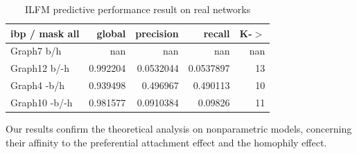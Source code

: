 \begin{table} \label{table:real2}
    \caption{ILFM predictive performance result on real networks}
\begin{tabular}{lrrrr}
\hline
 ibp / mask all   &     global &   precision &      recall &   K-\ensuremath{>} \\
\hline
 Graph7 b/h       & nan        & nan         & nan         &   nan \\
 Graph12 b/-h     &   0.992204 &   0.0532044 &   0.0537897 &    13 \\
 Graph4 -b/h      &   0.939498 &   0.496967  &   0.490113  &    10 \\
 Graph10 -b/-h    &   0.981577 &   0.0910384 &   0.09826   &    11 \\
\hline
\end{tabular}  
\end{table}

Our results confirm the theoretical analysis on nonparametric models, concerning their affinity to the preferential attachment effect and the homophily effect.




